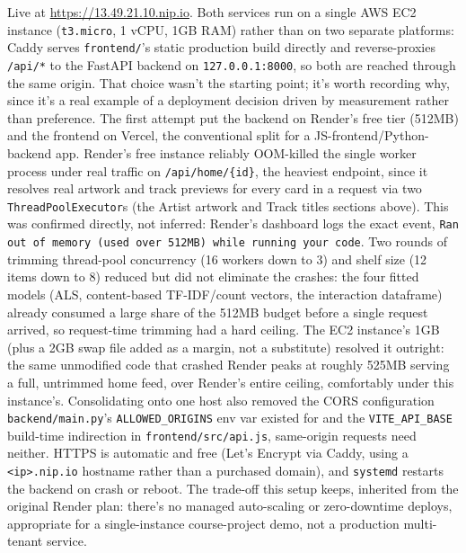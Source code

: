 \documentclass[11pt,a4paper]{article}
\newcommand{\code}[1]{\texttt{#1}}
\begin{document}
Live at \url{https://13.49.21.10.nip.io}. Both services run on a single AWS EC2 instance (\code{t3.micro}, 1 vCPU, 1GB RAM) rather than on two separate platforms: Caddy serves \code{frontend/}'s static production build directly and reverse-proxies \code{/api/*} to the FastAPI backend on \code{127.0.0.1:8000}, so both are reached through the same origin. That choice wasn't the starting point; it's worth recording why, since it's a real example of a deployment decision driven by measurement rather than preference. The first attempt put the backend on Render's free tier (512MB) and the frontend on Vercel, the conventional split for a JS-frontend/Python-backend app. Render's free instance reliably OOM-killed the single worker process under real traffic on \code{/api/home/\{id\}}, the heaviest endpoint, since it resolves real artwork and track previews for every card in a request via two \code{ThreadPoolExecutor}s (the Artist artwork and Track titles sections above). This was confirmed directly, not inferred: Render's dashboard logs the exact event, \code{Ran out of memory (used over 512MB) while running your code}. Two rounds of trimming thread-pool concurrency (16 workers down to 3) and shelf size (12 items down to 8) reduced but did not eliminate the crashes: the four fitted models (ALS, content-based TF-IDF/count vectors, the interaction dataframe) already consumed a large share of the 512MB budget before a single request arrived, so request-time trimming had a hard ceiling. The EC2 instance's 1GB (plus a 2GB swap file added as a margin, not a substitute) resolved it outright: the same unmodified code that crashed Render peaks at roughly 525MB serving a full, untrimmed home feed, over Render's entire ceiling, comfortably under this instance's. Consolidating onto one host also removed the CORS configuration \code{backend/main.py}'s \code{ALLOWED\_ORIGINS} env var existed for and the \code{VITE\_API\_BASE} build-time indirection in \code{frontend/src/api.js}, same-origin requests need neither. HTTPS is automatic and free (Let's Encrypt via Caddy, using a \code{<ip>.nip.io} hostname rather than a purchased domain), and \code{systemd} restarts the backend on crash or reboot. The trade-off this setup keeps, inherited from the original Render plan: there's no managed auto-scaling or zero-downtime deploys, appropriate for a single-instance course-project demo, not a production multi-tenant service.
\end{document}
